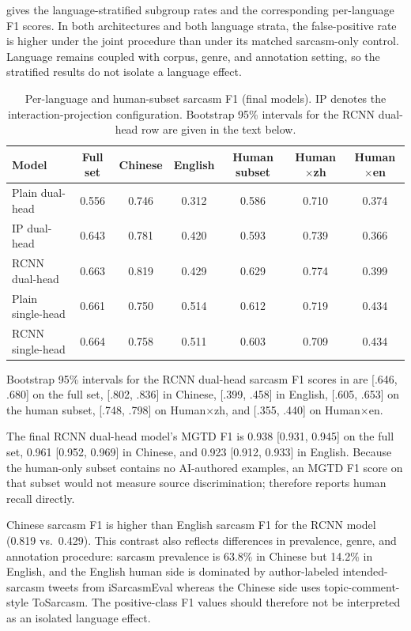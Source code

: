  gives the language-stratified subgroup rates and  the corresponding per-language F1 scores. In both architectures and both language strata, the false-positive rate is higher under the joint procedure than under its matched sarcasm-only control. Language remains coupled with corpus, genre, and annotation setting, so the stratified results do not isolate a language effect.

\begin{table}[t]
  \centering
  \small
  \setlength{\tabcolsep}{4pt}
  \begin{tabular}{@{}lcccccc@{}}
    \toprule
    \textbf{Model} & \textbf{Full set} & \textbf{Chinese} & \textbf{English} & \textbf{Human subset} & \textbf{Human$\times$zh} & \textbf{Human$\times$en} \\
    \midrule
    Plain dual-head & 0.556 & 0.746 & 0.312 & 0.586 & 0.710 & 0.374 \\
    IP dual-head & 0.643 & 0.781 & 0.420 & 0.593 & 0.739 & 0.366 \\
    RCNN dual-head & 0.663 & 0.819 & 0.429 & 0.629 & 0.774 & 0.399 \\
    Plain single-head & 0.661 & 0.750 & 0.514 & 0.612 & 0.719 & 0.434 \\
    RCNN single-head & 0.664 & 0.758 & 0.511 & 0.603 & 0.709 & 0.434 \\
    \bottomrule
  \end{tabular}
  \caption{Per-language and human-subset sarcasm F1 (final models). IP denotes the interaction-projection configuration. Bootstrap 95\% intervals for the RCNN dual-head row are given in the text below.}
  \label{tab:lang-f1}
\end{table}

Bootstrap 95\% intervals for the RCNN dual-head sarcasm F1 scores in  are [.646, .680] on the full set, [.802, .836] in Chinese, [.399, .458] in English, [.605, .653] on the human subset, [.748, .798] on Human$\times$zh, and [.355, .440] on Human$\times$en.

The final RCNN dual-head model's MGTD F1 is 0.938 [0.931, 0.945] on the full set, 0.961 [0.952, 0.969] in Chinese, and 0.923 [0.912, 0.933] in English. Because the human-only subset contains no AI-authored examples, an MGTD F1 score on that subset would not measure source discrimination;  therefore reports human recall directly.

Chinese sarcasm F1 is higher than English sarcasm F1 for the RCNN model (0.819 vs.\ 0.429). This contrast also reflects differences in prevalence, genre, and annotation procedure: sarcasm prevalence is 63.8\% in Chinese but 14.2\% in English, and the English human side is dominated by author-labeled intended-sarcasm tweets from iSarcasmEval whereas the Chinese side uses topic-comment-style ToSarcasm. The positive-class F1 values should therefore not be interpreted as an isolated language effect.

